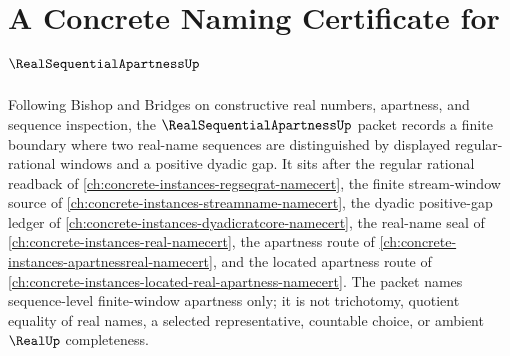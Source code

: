 \chapter{A Concrete Naming Certificate for $\RealSequentialApartnessUp$}
\label{ch:concrete-instances-real-sequential-apartness-namecert}

Following Bishop and Bridges on constructive real numbers, apartness, and sequence inspection, the $\RealSequentialApartnessUp$ packet records a finite boundary where two real-name sequences are distinguished by displayed regular-rational windows and a positive dyadic gap. It sits after the regular rational readback of \autoref{ch:concrete-instances-regseqrat-namecert}, the finite stream-window source of \autoref{ch:concrete-instances-streamname-namecert}, the dyadic positive-gap ledger of \autoref{ch:concrete-instances-dyadicratcore-namecert}, the real-name seal of \autoref{ch:concrete-instances-real-namecert}, the apartness route of \autoref{ch:concrete-instances-apartnessreal-namecert}, and the located apartness route of \autoref{ch:concrete-instances-located-real-apartness-namecert}. The packet names sequence-level finite-window apartness only; it is not trichotomy, quotient equality of real names, a selected representative, countable choice, or ambient $\RealUp$ completeness.

